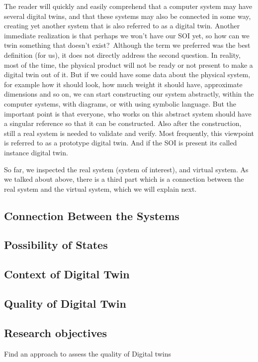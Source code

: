 \documentclass[9pt,conference]{IEEEtran}
\begin{document}
    The reader will quickly and easily comprehend that a computer system may have several digital twins, 
    and that these systems may also be connected in some way, 
    creating yet another system that is also referred to as a digital twin. 
    Another immediate realization is that perhaps we won't have our SOI yet, 
    so how can we twin something that doesn't exist? Although the term we preferred was the best definition (for us), 
    it does not directly address the second question. In reality, most of the time, 
    the physical product will not be ready or not present to make a digital twin out of it. 
    But if we could have some data about the physical system, for example how it should look, 
    how much weight it should have, approximate dimensions and so on,  we can start constructing our system abstractly, 
    within the computer systems, with diagrams, or with using symbolic language. 
    But the important point is that everyone, who works on this abstract system should have a singular reference so that it can be constructed. Also after the construction, 
    still a real system is needed to validate and verify. Most frequently, this viewpoint is referred to as a prototype digital twin. And if the SOI is present its called instance digital twin.
    

    So far, we inspected the real system (system of interest), and virtual system. 
    As we talked about above, there is a third part which is a connection between the real system and the virtual system, which we will explain next.
    
    \subsection{Connection Between the Systems}

    \subsection{Possibility of States}
    \subsection{Context of Digital Twin}
    \subsection{Quality of Digital Twin}

    \subsection{Research objectives}
    Find an approach to assess the quality of Digital twins
\end{document}
